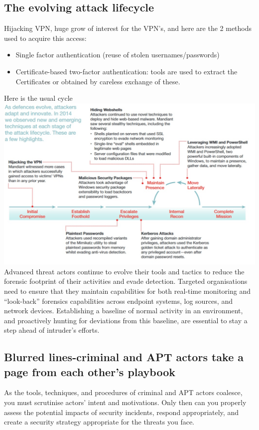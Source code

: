 \documentclass[10pt,a4paper]{report}
\begin{document}
\subsection{The evolving attack lifecycle}
Hijacking VPN, huge grow of interest for the VPN's, and here are the 2 methods used to acquire this access:\\
\begin{itemize}
\item Single factor authentication (reuse of stolen usernames/passwords)
\item Certificate-based two-factor 
authentication: tools are used to extract the Certificates or obtained by careless exchange of these.
\end{itemize}
Here is the usual cycle\\
\includegraphics[scale=0.55]{AttackLifecycle.jpg}
 Advanced threat actors continue to evolve their tools and 
tactics to reduce the forensic footprint of their activities and evade detection. 
Targeted organisations need to ensure that they maintain capabilities for both 
real-time monitoring and “look-back” forensics capabilities across endpoint 
systems, log sources, and network devices. Establishing a baseline of normal activity 
in an environment, and proactively hunting for deviations from this baseline, are 
essential to stay a step ahead of intruder’s efforts.
\subsection{Blurred lines-criminal and APT actors take a page from each other's playbook}
 As the tools, techniques, and procedures of criminal and  
APT actors coalesce, you must scrutinise actors’ intent and motivations. Only  
then can you properly assess the potential impacts of security incidents, respond 
appropriately, and create a security strategy appropriate for the threats you face. 
\end{document}
